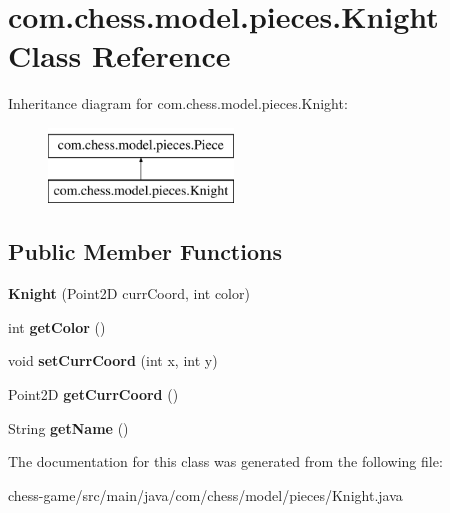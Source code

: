 \hypertarget{classcom_1_1chess_1_1model_1_1pieces_1_1_knight}{}\section{com.\+chess.\+model.\+pieces.\+Knight Class Reference}
\label{classcom_1_1chess_1_1model_1_1pieces_1_1_knight}
Inheritance diagram for com.\+chess.\+model.\+pieces.\+Knight\+:\begin{figure}[H]
\begin{center}
\leavevmode
\includegraphics[height=2.000000cm]{classcom_1_1chess_1_1model_1_1pieces_1_1_knight}
\end{center}
\end{figure}
\subsection*{Public Member Functions}
\begin{DoxyCompactItemize}
\item 
\mbox{\label{classcom_1_1chess_1_1model_1_1pieces_1_1_knight_a8832444d29c97db8d9bcc7f729b7ae8f}} 
{\bfseries Knight} (Point2D curr\+Coord, int color)
\item 
\mbox{\label{classcom_1_1chess_1_1model_1_1pieces_1_1_knight_a1a170b4963171ea9346923930fd9a49e}} 
int {\bfseries get\+Color} ()
\item 
\mbox{\label{classcom_1_1chess_1_1model_1_1pieces_1_1_knight_a3b3f4280baf2162ae1e5c5dc0c20eb33}} 
void {\bfseries set\+Curr\+Coord} (int x, int y)
\item 
\mbox{\label{classcom_1_1chess_1_1model_1_1pieces_1_1_knight_aadb0fb547208bef0de3f0a0146ab0ee8}} 
Point2D {\bfseries get\+Curr\+Coord} ()
\item 
\mbox{\label{classcom_1_1chess_1_1model_1_1pieces_1_1_knight_afc14697d0f744c8a003e7ebbb0091b72}} 
String {\bfseries get\+Name} ()
\end{DoxyCompactItemize}


The documentation for this class was generated from the following file\+:\begin{DoxyCompactItemize}
\item 
chess-\/game/src/main/java/com/chess/model/pieces/Knight.\+java\end{DoxyCompactItemize}
